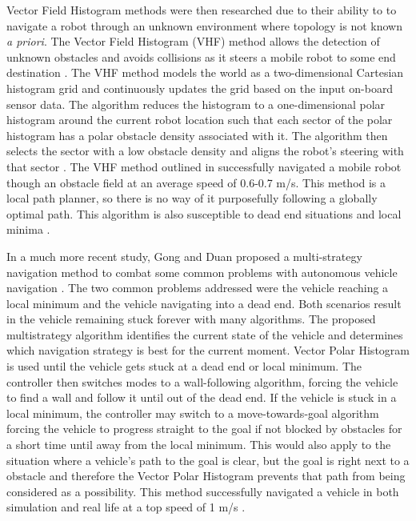 \documentclass[12pt,onecolumn]{report}
\begin{document}
Vector Field Histogram methods were then researched due to their ability to to navigate a robot through an unknown environment where topology is not known \textit{a priori}. The Vector Field Histogram (VHF) method allows the detection of unknown obstacles and avoids collisions as it steers a mobile robot to some end destination \cite{Borenstein&Koren1991}. The VHF method models the world as a two-dimensional Cartesian histogram grid and continuously updates the grid based on the input on-board sensor data. The algorithm reduces the histogram to a one-dimensional polar histogram around the current robot location such that each sector of the polar histogram has a polar obstacle density associated with it. The algorithm then selects the sector with a low obstacle density and aligns the robot's steering with that sector \cite{Borenstein&Koren1991}. The VHF method outlined in \cite{Borenstein&Koren1991} successfully navigated a mobile robot though an obstacle field at an average speed of 0.6-0.7 m/s. This method is a local path planner, so there is no way of it purposefully following a globally optimal path. This algorithm is also susceptible to dead end situations and local minima \cite{Borenstein&Koren1991}.

In a much more recent study, Gong and Duan proposed a multi-strategy navigation method to combat some common problems with autonomous vehicle navigation \cite{Gong&Duan2009}. The two common problems addressed were the vehicle reaching a local minimum and the vehicle navigating into a dead end. Both scenarios result in the vehicle remaining stuck forever with many algorithms. The proposed multistrategy algorithm identifies the current state of the vehicle and determines which navigation strategy is best for the current moment. Vector Polar Histogram is used until the vehicle gets stuck at a dead end or local minimum. The controller then switches modes to a wall-following algorithm, forcing the vehicle to find a wall and follow it until out of the dead end. If the vehicle is stuck in a local minimum, the controller may switch to a move-towards-goal algorithm forcing the vehicle to progress straight to the goal if not blocked by obstacles for a short time until away from the local minimum. This would also apply to the situation where a vehicle's path to the goal is clear, but the goal is right next to a obstacle and therefore the Vector Polar Histogram prevents that path from being considered as a possibility. This method successfully navigated a vehicle in both simulation and real life at a top speed of 1 m/s \cite{Gong&Duan2009}.
\end{document}
